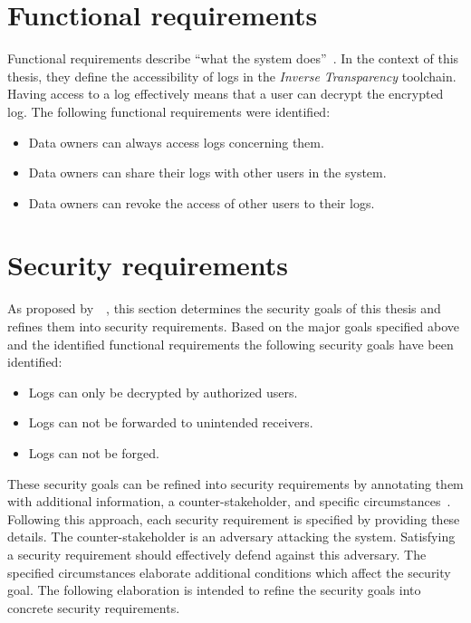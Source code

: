 \documentclass[../main.tex]{subfiles}
\begin{document}
\section{Functional requirements}\label{functional-requriements}
Functional requirements describe \enquote{what the system does}~\cite[11]{Mylopoulos1992}.
In the context of this thesis, they define the accessibility of logs in the \emph{Inverse Transparency} toolchain.
Having access to a log effectively means that a user can decrypt the encrypted log.
The following functional requirements were identified:
\begin{itemize}
    \item Data owners can always access logs concerning them.
    \item Data owners can share their logs with other users in the system.
    \item Data owners can revoke the access of other users to their logs.
\end{itemize}

\section{Security requirements}\label{security-requriements}
As proposed by~\citeauthor{Fabian2010}~\cite{Fabian2010}, this section determines the security goals of this thesis and refines them into security requirements.
Based on the major goals specified above and the identified functional requirements the following security goals have been identified:
\begin{itemize}
    \item Logs can only be decrypted by authorized users.
    \item Logs can not be forwarded to unintended receivers.
    \item Logs can not be forged.
  \end{itemize}

These security goals can be refined into security requirements by annotating them with additional information, a counter-stakeholder, and specific circumstances~\cite{Fabian2010}.
Following this approach, each security requirement is specified by providing these details.
The counter-stakeholder is an adversary attacking the system.
Satisfying a security requirement should effectively defend against this adversary.
The specified circumstances elaborate additional conditions which affect the security goal.
The following elaboration is intended to refine the security goals into concrete security requirements.
\end{document}
